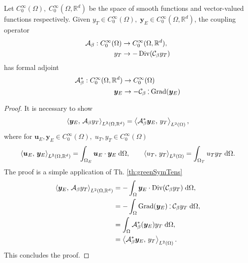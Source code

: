 \begin{proposition}
Let $C_0^{\infty}(\Omega), \; C_0^{\infty}(\Omega, \mathbb{R}^d)$ be the space of smooth functions and vector-valued functions respectively. Given $y_T \in C_0^{\infty}(\Omega), \; \bm{y}_E \in C_0^{\infty}(\Omega, \mathbb{R}^d)$, the coupling operator 
\begin{equation}
\begin{aligned}
\mathcal{A}_\beta  : C_0^{\infty}(\Omega) &\rightarrow C_0^{\infty}(\Omega, \mathbb{R}^d), \\
y_T &\rightarrow - \Div(\mathcal{C}_\beta y_T)
\end{aligned}
\end{equation}
has formal adjoint 
\begin{equation}
\begin{aligned}
\mathcal{A}_\beta^* : C_0^{\infty}(\Omega, \mathbb{R}^d) &\rightarrow C_0^{\infty}(\Omega) \\
\bm{y}_E &\rightarrow -\mathcal{C}_\beta \cddot  \Grad(\bm{y}_E)
\end{aligned}
\end{equation}
\begin{proof}
It is necessary to show
\begin{equation}
	\inner[L^2(\Omega, \mathbb{R}^d)]{\bm{y}_E}{\mathcal{A}_\beta y_T} = \inner[L^2(\Omega)]{\mathcal{A}_\beta^*\bm{y}_E}{y_T}, 
\end{equation}
where for $\bm{u}_E, \bm{y}_E \in C_0^{\infty}(\Omega), \; u_T, y_T \in C_0^{\infty}(\Omega)$
\begin{equation}
\inner[L^2(\Omega, \mathbb{R}^d)]{\bm{u}_E}{\bm{y}_E} = \int_{\Omega_E} \bm{u}_E \cdot \bm{y}_E \d{\Omega}, \qquad \inner[L^2(\Omega)]{u_T}{y_T} = \int_{\Omega_T} u_T y_T \d{\Omega}.
\end{equation}
The proof is a simple application of Th. \ref{th:greenSymTens}
\begin{equation}
\begin{aligned}
\inner[L^2(\Omega, \mathbb{R}^d)]{\bm{y}_E}{\mathcal{A}_\beta y_T} &= -\int_{\Omega} \bm{y}_E \cdot \Div(\mathcal{C}_\beta y_T) \d{\Omega}, \\
&= -\int_{\Omega} \Grad(\bm{y}_E) \cddot \mathcal{C}_\beta y_T \d{\Omega}, \\
&= \int_{\Omega} \mathcal{A}_\beta^*(\bm{y}_E) y_T \d{\Omega}, \\
&= \inner[L^2(\Omega)]{\mathcal{A}_\beta^*\bm{y}_E}{y_T}.
\end{aligned}
\end{equation}
This concludes the proof.
\end{proof}
\end{proposition}

